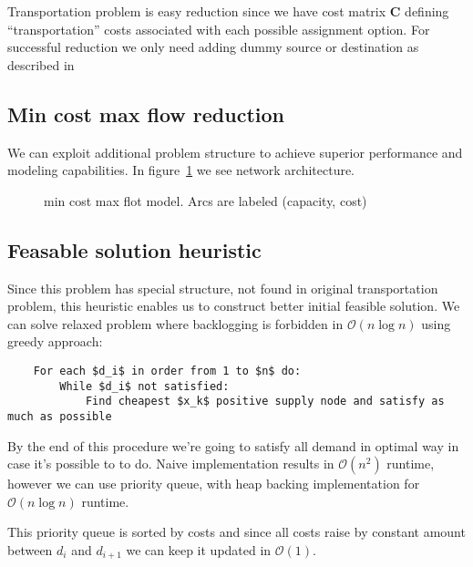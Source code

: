 Transportation problem \autocite{or-textbook} is easy reduction since we have cost matrix $\mathbf{C}$ defining ``transportation'' costs associated with each possible assignment option. For successful reduction we only need adding dummy source or destination as described in \autocite{or-textbook}


\subsection{Min cost max flow reduction}
\label{sub:Min cost max flow reduction}

We can exploit additional problem structure to achieve superior performance and modeling capabilities. In figure~\ref{fig:mcmf-model} we see network architecture.

\begin{figure}[h]
    \label{fig:mcmf-model}
    \centering
    
    \caption{min cost max flot model. Arcs are labeled (capacity, cost)}
\end{figure}

\subsection{Feasable solution heuristic}
\label{subs:Feasable solution heuristic}
Since this problem has special structure, not found in original transportation problem, this heuristic enables us to construct better initial feasible solution. We can solve relaxed problem where backlogging is forbidden in $\mathcal{O}(n \log{} n)$ using greedy approach:

\begin{verbatim}
    For each $d_i$ in order from 1 to $n$ do:
        While $d_i$ not satisfied:
            Find cheapest $x_k$ positive supply node and satisfy as much as possible
\end{verbatim}

By the end of this procedure we're going to satisfy all demand in optimal way in case it's possible to to do. Naive implementation results in $\mathcal{O}(n^2)$ runtime, however we can use priority queue, with heap backing implementation for $\mathcal{O}(n\log{}n)$ runtime.

This priority queue is sorted by costs and since all costs raise by constant amount between $d_i$ and $d_{i+1}$ we can keep it updated in $\mathcal{O}(1)$.

